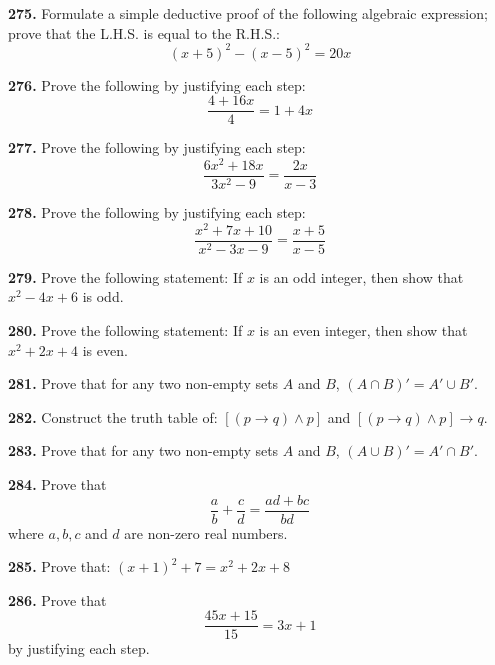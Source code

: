 \documentclass[11pt]{article}
\begin{document}
\bigskip
\noindent\textbf{275.} Formulate a simple deductive proof of the following algebraic expression; prove that the L.H.S. is equal to the R.H.S.:
\[
(x+5)^2 - (x-5)^2 = 20x
\]

\bigskip
\noindent\textbf{276.} Prove the following by justifying each step:
\[
\frac{4+16x}{4} = 1 + 4x
\]

\bigskip
\noindent\textbf{277.} Prove the following by justifying each step:
\[
\frac{6x^2 + 18x}{3x^2 - 9} = \frac{2x}{x-3}
\]

\bigskip
\noindent\textbf{278.} Prove the following by justifying each step:
\[
\frac{x^2 + 7x + 10}{x^2 - 3x - 9} = \frac{x+5}{x-5}
\]

\bigskip
\noindent\textbf{279.} Prove the following statement: If $x$ is an odd integer, then show that $x^2 - 4x + 6$ is odd.

\bigskip
\noindent\textbf{280.} Prove the following statement: If $x$ is an even integer, then show that $x^2 + 2x + 4$ is even.

\bigskip
\noindent\textbf{281.} Prove that for any two non-empty sets $A$ and $B$, $(A \cap B)' = A' \cup B'$.

\bigskip
\noindent\textbf{282.} Construct the truth table of: $[(p \rightarrow q) \wedge p]$ and $[(p \rightarrow q) \wedge p] \rightarrow q$.

\bigskip
\noindent\textbf{283.} Prove that for any two non-empty sets $A$ and $B$, $(A \cup B)' = A' \cap B'$.

\bigskip
\noindent\textbf{284.} Prove that
\[
\frac{a}{b} + \frac{c}{d} = \frac{ad+bc}{bd}
\]
where $a, b, c$ and $d$ are non-zero real numbers.

\bigskip
\noindent\textbf{285.} Prove that: $(x+1)^2 + 7 = x^2 + 2x + 8$

\bigskip
\noindent\textbf{286.} Prove that
\[
\frac{45x+15}{15} = 3x+1
\]
by justifying each step.
\end{document}
